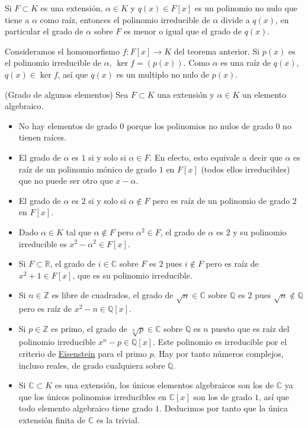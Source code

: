 
Si \(F\subset K\) es una extensión, \(\alpha\in K\) y \(q(x)\in F[x]\)
es un polinomio no nulo que tiene a \(\alpha\) como raíz, entonces el
polinomio irreducible de \(\alpha\) divide a \(q(x)\), en particular el
grado de \(\alpha\) sobre \(F\) es menor o igual que el grado de
\(q(x)\). 


Consideramos el homomorfismo \(f\colon F[x]\rightarrow K\) del teorema
anterior. Si \(p(x)\) es el polinomio irreducible de \(\alpha\),
\(\ker f=(p(x))\). Como \(\alpha\) es una raíz de \(q(x)\),
\(q(x)\in\ker f\), así que \(q(x)\) es un multiplo no nulo de \(p(x)\).

\textrm{\normalfont (Grado de algunos elementos)} Sea
\(F\subset K\) una extensión y \(\alpha\in K\) un elemento algebraico.

\begin{itemize}
\item
  No hay elementos de grado \(0\) porque los polinomios no nulos de
  grado \(0\) no tienen raíces.
\item
  El grado de \(\alpha\) es \(1\) si y solo si \(\alpha\in F\). En
  efecto, esto equivale a decir que \(\alpha\) es raíz de un polinomio
  mónico de grado \(1\) en \(F[x]\) (todos ellos irreducibles) que no
  puede ser otro que \(x-\alpha\).
\item
  El grado de \(\alpha\) es \(2\) si y solo si \(\alpha\notin F\) pero
  es raíz de un polinomio de grado \(2\) en \(F[x]\).
\item
  Dado \(\alpha\in K\) tal que \(\alpha\notin F\) pero
  \(\alpha^2\in F\), el grado de \(\alpha\) es \(2\) y su polinomio
  irreducible es \(x^2-\alpha^2\in F[x]\).
\item
  Si \(F\subset\mathbb R\), el grado de \(i\in\mathbb C\) sobre \(F\) es
  \(2\) pues \(i\notin F\) pero es raíz de \(x^2+1\in F[x]\), que es su
  polinomio irreducible.
\item
  Si \(n\in\mathbb Z\) es libre de cuadrados, el grado de
  \(\sqrt{n}\in\mathbb C\) sobre \(\mathbb Q\) es \(2\) pues
  \(\sqrt{n}\notin\mathbb Q\) pero es raíz de \(x^2-n\in\mathbb Q[x]\).
\item
  Si \(p\in\mathbb Z\) es primo, el grado de \(\sqrt[n]{p}\in\mathbb C\)
  sobre \(\mathbb Q\) es \(n\) puesto que es raíz del polinomio
  irreducible \(x^n-p\in\mathbb Q[x]\). Este polinomio es irreducible
  por el criterio de
  \href{static/rings/factorization/\#eisenstein}{Eisenstein} para el
  primo \(p\). Hay por tanto números complejos, incluso reales, de grado
  cualquiera sobre \(\mathbb Q\).
\item
  Si \(\mathbb C\subset K\) es una extensión, los únicos elementos
  algebraicos son los de \(\mathbb C\) ya que los únicos polinomios
  irreducibles en \(\mathbb C[x]\) son los de grado \(1\), así que todo
  elemento algebraico tiene grado \(1\). Deducimos por tanto que la
  única extensión finita de \(\mathbb C\) es la trivial.
\end{itemize}

